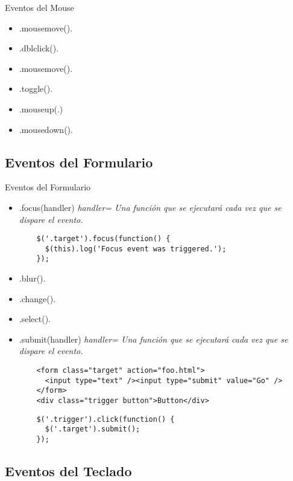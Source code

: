 \begin{frame}[fragile]{Eventos del Mouse} %
\begin{itemize}
    \item .mousemove(). 
    \item .dblclick(). 
    \item .mousemove(). 
    \item .toggle(). 
    \item .mouseup(.) 
    \item .mousedown().
\end{itemize}
\end{frame}

\subsection{Eventos del Formulario} %

\begin{frame}[fragile]{Eventos del Formulario} %
\begin{itemize}
    \item .focus(handler) \textit{ handler= Una función que se ejecutará cada vez que se dispare el evento.}
    \begin{lstlisting}
    $('.target').focus(function() {
      $(this).log('Focus event was triggered.');
    });
    \end{lstlisting}
    \item .blur().
    \item .change().
    \item .select().
    \item .submit(handler) \textit{ handler= Una función que se ejecutará cada vez que se dispare el evento.} 
    \begin{lstlisting}
    <form class="target" action="foo.html">
      <input type="text" /><input type="submit" value="Go" />
    </form>
    <div class="trigger button">Button</div>
    \end{lstlisting}
    \begin{lstlisting}
    $('.trigger').click(function() {
      $('.target').submit();
    });
    \end{lstlisting}
\end{itemize}
\end{frame}

\subsection{Eventos del Teclado} %

